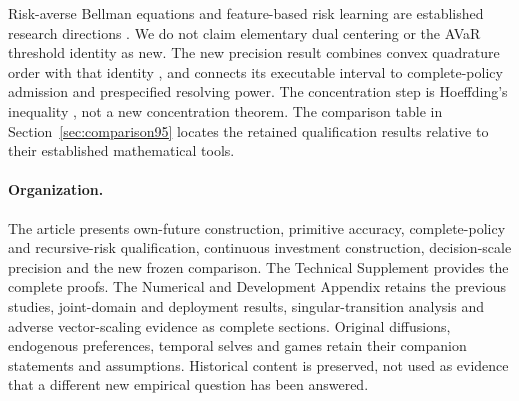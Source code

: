 Risk-averse Bellman equations and feature-based risk learning are established research directions \citep{ruszczynski2010risk,ruszczynski2014erratum,ruszczynskiyang2025}. We do not claim elementary dual centering or the AVaR threshold identity as new. The new precision result combines convex quadrature order \citep{alomari2016hermite} with that identity \citep{RockafellarUryasev2000}, and connects its executable interval to complete-policy admission and prespecified resolving power. The concentration step is Hoeffding's inequality \citep{hoeffding1963}, not a new concentration theorem. The comparison table in Section~\ref{sec:comparison95} locates the retained qualification results relative to their established mathematical tools.

\paragraph{Organization.}
The article presents own-future construction, primitive accuracy, complete-policy and recursive-risk qualification, continuous investment construction, decision-scale precision and the new frozen comparison. The Technical Supplement provides the complete proofs. The Numerical and Development Appendix retains the previous studies, joint-domain and deployment results, singular-transition analysis and adverse vector-scaling evidence as complete sections. Original diffusions, endogenous preferences, temporal selves and games retain their companion statements and assumptions. Historical content is preserved, not used as evidence that a different new empirical question has been answered.
